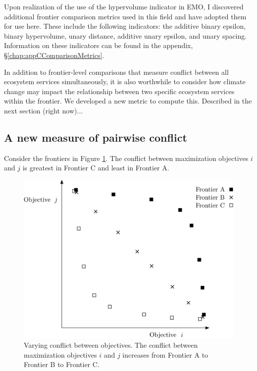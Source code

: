 Upon realization of the use of the hypervolume indicator in EMO, I discovered additional frontier comparison metrics used in this field and have adopted them for use here. These include the following indicators: the additive binary epsilon, binary hypervolume, unary distance, additive unary epsilon, and unary spacing. Information on these indicators can be found in the appendix, \S \ref{chap:appCComparisonMetrics}.

In addition to frontier-level comparisons that measure conflict between all ecosystem services simultaneously, it is also worthwhile to consider how climate change may impact the relationship between two specific ecosystem services within the frontier. We developed a new metric to compute this. Described in the next section (right now)...

\subsection{A new measure of pairwise conflict}
Consider the frontiers in Figure \ref{fig:ConflictVariesExample}. The conflict between maximization objectives $i$ and $j$ is greatest in Frontier C and least in Frontier A.
\begin{figure}[ht]
\centering
\includegraphics[width=.6\textwidth]{../images/ConflictVariesExample}
\caption[Example of varying conflict between objectives]{Varying conflict between objectives. The conflict between maximization objectives $i$ and $j$ increases from Frontier A to Frontier B to Frontier C.}
\label{fig:ConflictVariesExample}
\end{figure}

